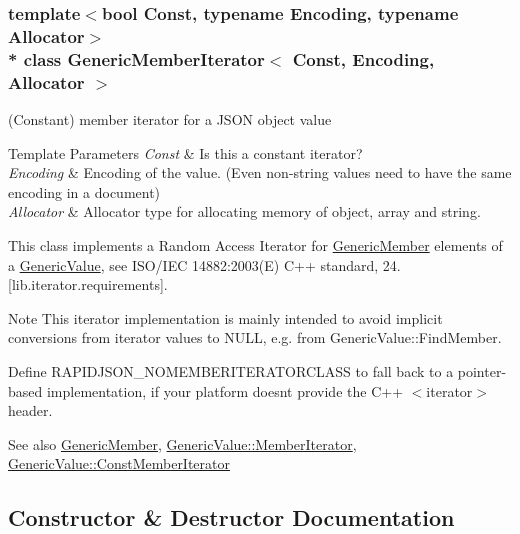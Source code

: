 \subsubsection*{template$<$bool Const, typename Encoding, typename Allocator$>$\\*
class Generic\+Member\+Iterator$<$ Const, Encoding, Allocator $>$}

(Constant) member iterator for a J\+S\+ON object value 


\begin{DoxyTemplParams}{Template Parameters}
{\em Const} & Is this a constant iterator? \\
\hline
{\em Encoding} & Encoding of the value. (Even non-\/string values need to have the same encoding in a document) \\
\hline
{\em Allocator} & Allocator type for allocating memory of object, array and string.\\
\hline
\end{DoxyTemplParams}
This class implements a Random Access Iterator for \hyperlink{struct_generic_member}{Generic\+Member} elements of a \hyperlink{class_generic_value}{Generic\+Value}, see I\+S\+O/\+I\+EC 14882\+:2003(E) C++ standard, 24. \mbox{[}lib.\+iterator.\+requirements\mbox{]}.

\begin{DoxyNote}{Note}
This iterator implementation is mainly intended to avoid implicit conversions from iterator values to {\ttfamily N\+U\+LL}, e.\+g. from Generic\+Value\+::\+Find\+Member.

Define {\ttfamily R\+A\+P\+I\+D\+J\+S\+O\+N\+\_\+\+N\+O\+M\+E\+M\+B\+E\+R\+I\+T\+E\+R\+A\+T\+O\+R\+C\+L\+A\+SS} to fall back to a pointer-\/based implementation, if your platform doesn\textquotesingle{}t provide the C++ $<$iterator$>$ header.
\end{DoxyNote}
\begin{DoxySeeAlso}{See also}
\hyperlink{struct_generic_member}{Generic\+Member}, \hyperlink{class_generic_value_a349b8faae61edc42b4289726820be439}{Generic\+Value\+::\+Member\+Iterator}, \hyperlink{class_generic_value_aac08c3e660a9036d3dcb8b10ff6c61f4}{Generic\+Value\+::\+Const\+Member\+Iterator} 
\end{DoxySeeAlso}


\subsection{Constructor \& Destructor Documentation}
